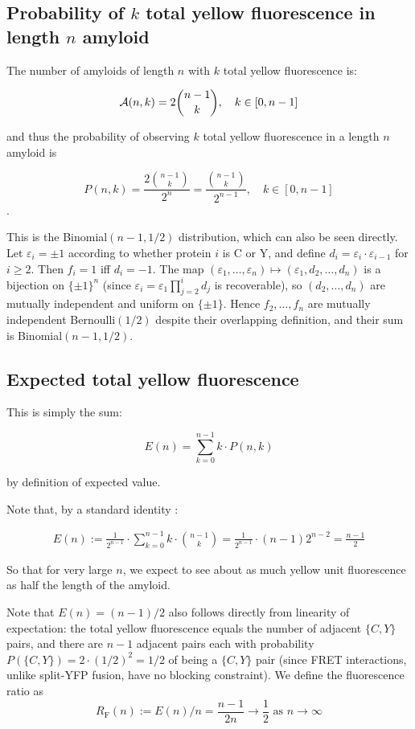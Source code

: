 \documentclass[11pt]{article}
\newcommand{\cA}{ {\cal A} }
\begin{document}
\subsection{Probability of $k$ total yellow fluorescence in length $n$ amyloid}

The number of amyloids of length $n$ with $k$ total yellow fluorescence is:

\[
\cA(n,k) = 2\binom{n-1}{k}, \quad k \in [0,n - 1]
\]

and thus the probability of observing $k$ total yellow fluorescence in a length $n$ amyloid is


\[
P(n,k) = \frac{2\binom{n-1}{k}}{2^n} = \frac{\binom{n-1}{k}}{2^{n-1}}, \quad k \in [0,n - 1]
\].

This is the Binomial$(n-1, 1/2)$ distribution, which can also be seen directly. Let $\varepsilon_i = \pm 1$ according to whether protein $i$ is C or Y, and define $d_i = \varepsilon_i \cdot \varepsilon_{i-1}$ for $i \ge 2$. Then $f_i = 1$ iff $d_i = -1$. The map $(\varepsilon_1, \ldots, \varepsilon_n) \mapsto (\varepsilon_1, d_2, \ldots, d_n)$ is a bijection on $\{\pm 1\}^n$ (since $\varepsilon_i = \varepsilon_1 \prod_{j=2}^i d_j$ is recoverable), so $(d_2, \ldots, d_n)$ are mutually independent and uniform on $\{\pm 1\}$. Hence $f_2, \ldots, f_n$ are mutually independent Bernoulli$(1/2)$ despite their overlapping definition, and their sum is Binomial$(n-1, 1/2)$.

\subsection{Expected total yellow fluorescence}

This is simply the sum:

\[
    E(n) = \sum_{k = 0}^{n - 1} k \cdot P(n,k) 
\]

by definition of expected value.

Note that, by a standard identity \cite[\S 5.1, Eq.~5.5]{gkp1994}:

\begin{align*}
E(n) := \frac{1}{2^{n-1}} \cdot \sum_{k=0}^{n - 1} k \cdot \binom{n-1}{k} 
 =  \frac{1}{2^{n-1}} \cdot (n-1) 2^{n-2} = \frac{n - 1}{2}
\end{align*}

So that for very large $n$, we expect to see about as much yellow unit fluorescence as half the length of the amyloid.

Note that $E(n) = (n-1)/2$ also follows directly from linearity of expectation: the total yellow fluorescence equals the number of adjacent $\{C,Y\}$ pairs, and there are $n - 1$ adjacent pairs each with probability $P(\{C,Y\}) = 2 \cdot (1/2)^2 = 1/2$ of being a $\{C,Y\}$ pair (since FRET interactions, unlike split-YFP fusion, have no blocking constraint). We define the fluorescence ratio as
\[
R_{\text{F}}(n) := E(n)/n = \frac{n-1}{2n} \longrightarrow \frac{1}{2} \text{ as } n \to \infty
\]
\end{document}

